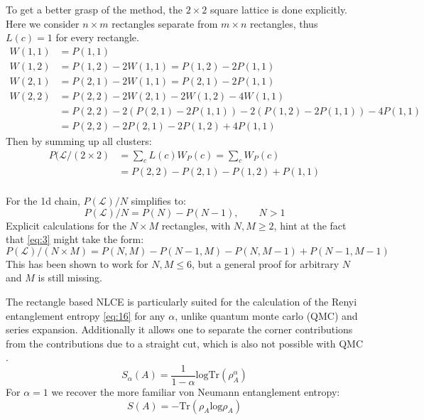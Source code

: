 \documentclass{article}
\begin{document}
To get a better grasp of the method, the $2 \times 2$ square lattice
is done explicitly. Here we consider $ n \times m$ rectangles separate from
$m \times n$ rectangles, thus $L(c) = 1$ for every rectangle.
\begin{align*}
W(1,1) &= P(1,1)\\
W(1,2) &= P(1,2) - 2W(1,1) = P(1,2) -2 P(1,1)\\
W(2,1) &= P(2,1) - 2W(1,1) = P(2,1) -2 P(1,1)\\
W(2,2) &= P(2,2) -2 W(2,1) -2 W(1,2) -4 W(1,1)\\
&= P(2,2) - 2 (P(2,1) -2
         P(1,1)) - 2(P(1,2) -2 P(1,1)) - 4 P(1,1)\\
&= P(2,2) -2 P(2,1) - 2 P(1,2) + 4 P(1,1)
\end{align*}
Then by summing up all clusters:
\begin{align*}
\label{eq:17}
P(\mathcal{L}/(2 \times 2) &=\sum\limits_c L(c) W_P(c) = \sum\limits_c
                      W_P(c)\\
 &= P(2,2) - P(2,1) - P(1,2) + P(1,1)
\end{align*}
\\
For the 1d chain, $P(\mathcal{L})/N$ simplifies to:
\begin{equation}
\label{eq:20}
P(\mathcal{L})/N = P(N) - P(N-1), \qquad N>1
\end{equation}
Explicit calculations for the $N \times M$ rectangles, with $N,M \geq 2$, hint at the fact that
\eqref{eq:3} might take the form:
\begin{equation}
\label{eq:21}
P(\mathcal{L})/(N \times M) = P(N,M) - P(N-1,M) - P(N,M-1) +
P(N-1,M-1)
\end{equation}
This has been shown to work for $N,M \leq 6$, but a general proof for
arbitrary $N$ and $M$ is still missing.

The rectangle based NLCE is particularly suited for the calculation of the
Renyi entanglement entropy \eqref{eq:16} for any $\alpha$, unlike
quantum monte carlo (QMC) and series expansion. Additionally it allows one
to separate the corner contributions from the contributions due to a
straight cut, which is also not possible with QMC \cite{Kallin,Melko}.\\
\begin{equation}
\label{eq:16}
S_{\alpha}(A) = \frac{1}{1-\alpha} \text{logTr}(\rho^{\alpha}_A)
\end{equation}
For $\alpha = 1$ we recover the more familiar von Neumann entanglement
entropy:
\begin{equation}
\label{eq:27}
S(A) = -\text{Tr}(\rho_A \text{log} \rho_A)
\end{equation}
\end{document}
